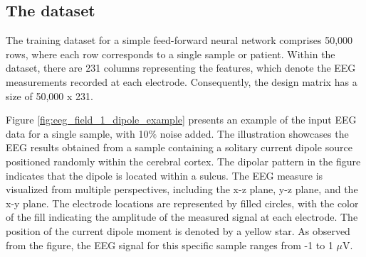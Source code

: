 \documentclass[a4paper, UKenglish, 11pt]{uiomaster}
\begin{document}
\subsection{The dataset}
The training dataset for a simple feed-forward neural network comprises 50,000 rows, where each row corresponds to a single sample or patient. Within the dataset, there are 231 columns representing the features, which denote the EEG measurements recorded at each electrode. Consequently, the design matrix has a size of 50,000 x 231.

Figure \ref{fig:eeg_field_1_dipole_example} presents an example of the input EEG data for a single sample, with 10$\%$ noise added. The illustration showcases the EEG results obtained from a sample containing a solitary current dipole source positioned randomly within the cerebral cortex. The dipolar pattern in the figure indicates that the dipole is located within a sulcus. The EEG measure is visualized from multiple perspectives, including the x-z plane, y-z plane, and the x-y plane. The electrode locations are represented by filled circles, with the color of the fill indicating the amplitude of the measured signal at each electrode. The position of the current dipole moment is denoted by a yellow star. As observed from the figure, the EEG signal for this specific sample ranges from -1 to 1 $\mu$V.
\end{document}
